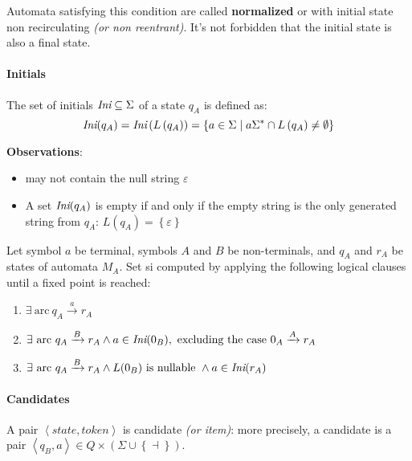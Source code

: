 \documentclass[english]{article}
\begin{document}
Automata satisfying this condition are called \textbf{normalized} or with initial state non recirculating \textit{(or non reentrant)}.
It's not forbidden that the initial state is also a final state.

\paragraph{Initials}

The set of initials \(\textit{Ini} \subseteq \Sigma\) of a state \(q_A\) is defined as:
\[ \textit{Ini}(q_A) = \textit{Ini}\left( L\left( q_A \right) \right) = \left\{ a \in \Sigma \mid a \Sigma^\ast \cap L\left( q_A \right) \neq \emptyset \right\} \]

\bigskip
\textbf{Observations}:
\begin{itemize}
  \item \Ini may not contain the null string \(\varepsilon\)
  \item A set \(\textit{Ini}(q_A)\) is empty if and only if the empty string is the only generated string from \(q_A\): \(L\left( q_A \right) = \left\{ \varepsilon \right\}\)
\end{itemize}

\bigskip
Let symbol \(a\) be terminal, symbols \(A\) and \(B\) be non-terminals, and \(q_A\) and \(r_A\) be states of automata \(M_A\).
Set \Ini si computed by applying the following logical clauses until a fixed point is reached:

\begin{enumerate}
  \item \(\exists \ \text{arc} \ q_A \xrightarrow{a} r_A\)
  \item \(\exists \ \text{arc} \ q_A \xrightarrow{B} r_A \land a \in \Ini(0_B), \ \text{excluding the case} \ 0_A \xrightarrow{A} r_A\)
  \item \(\exists \ \text{arc} \ q_A \xrightarrow{B} r_A \land L(0_B) \ \text{is nullable} \ \land a \in \textit{Ini}(r_A)\)
\end{enumerate}

\paragraph{Candidates}
\label{par:candidates}

A pair \(\left\langle \textit{state}, \textit{token} \right\rangle\) is candidate \textit{(or item)}:
more precisely, a candidate is a pair \(\left\langle q_B, a \right\rangle \in Q \times \left( \Sigma \cup \left\{ \dashv \right\} \right)\).
\end{document}
